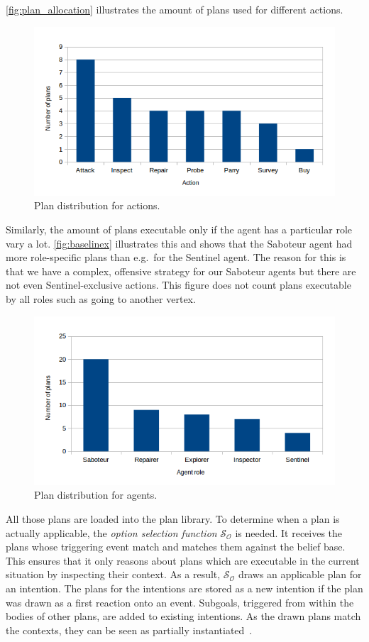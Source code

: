\autoref{fig:plan_allocation} illustrates the amount of plans used for different actions.
\begin{figure}
  \centering
  \includegraphics[width=\textwidth]{images/BDI_plan_distribution_action}
  \caption{Plan distribution for actions.}
  \label{fig:plan_allocation}
\end{figure}
Similarly, the amount of plans executable only if the agent has a particular role vary a lot.
\autoref{fig:baselinex} illustrates this and shows that the Saboteur agent had more role-specific plans than e.g.\ for the Sentinel agent.
The reason for this is that we have a complex, offensive strategy for our Saboteur agents but there are not even Sentinel-exclusive actions.
This figure does not count plans executable by all roles such as going to another vertex.
\begin{figure}
  \centering
  \includegraphics[width=\textwidth]{images/BDI_plan_distribution_role}
  \caption{Plan distribution for agents.}
  \label{fig:baselinex}
\end{figure}

All those plans are loaded into the plan library.
To determine when a plan is actually applicable, the \emph{option selection function} $\mathcal{S_O}$ is needed.
It receives the plans whose triggering event match and matches them against the belief base.
This ensures that it only reasons about plans which are executable in the current situation by inspecting their context.
As a result, $\mathcal{S_O}$ draws an applicable plan for an intention.
The plans for the intentions are stored as a new intention if the plan was drawn as a first reaction onto an event.
Subgoals, triggered from within the bodies of other plans, are added to existing intentions.
As the drawn plans match the contexts, they can be seen as partially instantiated~\cite{rafel_Javabased_2007}.

